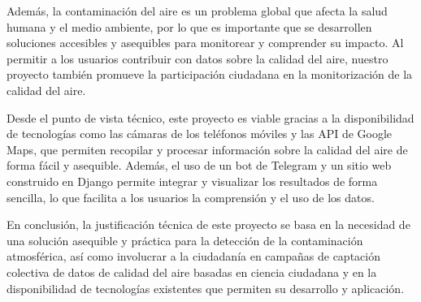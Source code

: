 Además, la contaminación del aire es un problema global que afecta la salud humana y el medio ambiente, por lo que es importante que se desarrollen soluciones accesibles y asequibles para monitorear y comprender su impacto. Al permitir a los usuarios contribuir con datos sobre la calidad del aire, nuestro proyecto también promueve la participación ciudadana en la monitorización de la calidad del aire.

Desde el punto de vista técnico, este proyecto es viable gracias a la disponibilidad de tecnologías como las cámaras de los teléfonos móviles y las API de Google Maps, que permiten recopilar y procesar información sobre la calidad del aire de forma fácil y asequible. Además, el uso de un bot de Telegram y un sitio web construido en Django permite integrar y visualizar los resultados de forma sencilla, lo que facilita a los usuarios la comprensión y el uso de los datos.

En conclusión, la justificación técnica de este proyecto se basa en la necesidad de una solución asequible y práctica para la detección de la contaminación atmosférica, así como involucrar a la ciudadanía en campañas de captación colectiva de datos de calidad del aire basadas en ciencia ciudadana y en la disponibilidad de tecnologías existentes que permiten su desarrollo y aplicación.